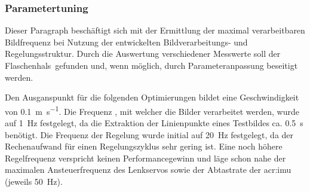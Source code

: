 \subsubsection{Parametertuning \dcsecondauthorshort}
Dieser Paragraph beschäftigt sich mit der Ermittlung der maximal verarbeitbaren Bildfrequenz bei Nutzung der entwickelten Bildverarbeitungs- und Regelungsstruktur. Durch die Auswertung verschiedener Messwerte soll der \glqq Flaschenhals\grqq\ gefunden und, wenn möglich, durch Parameteranpassung beseitigt werden.


Den Ausganspunkt für die folgenden Optimierungen bildet eine Geschwindigkeit von
\SI{0.1}{\metre\per\second}. Die Frequenz , mit welcher die Bilder verarbeitet werden, wurde auf \SI{1}{\hertz} festgelegt, da die Extraktion der Linienpunkte eines Testbildes ca. \SI{0.5}{\second} benötigt. Die Frequenz der Regelung  wurde initial auf \SI{20}{\hertz} festgelegt, da der Rechenaufwand für einen Regelungszyklus sehr gering ist. Eine noch höhere Regelfrequenz verspricht keinen Performancegewinn und läge schon nahe der maximalen Ansteuerfrequenz des Lenkservos sowie der Abtastrate der \gls{acr:imu} (jeweils \SI{50}{\hertz}).

